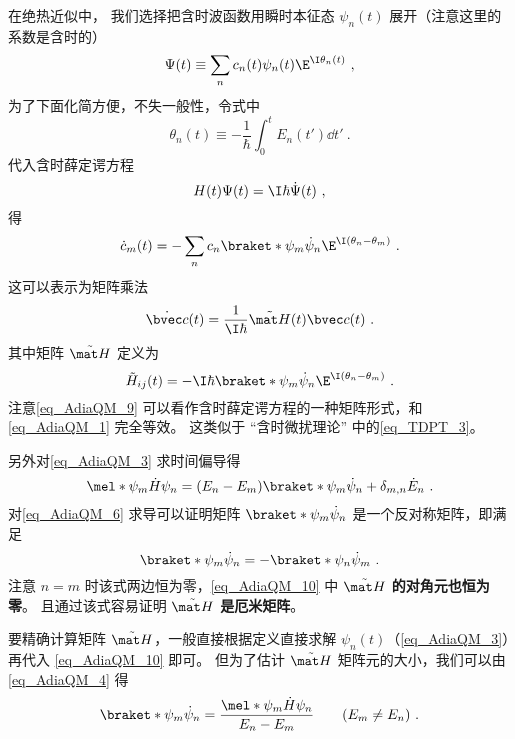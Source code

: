 在绝热近似中， 我们选择把含时波函数用瞬时本征态 $\psi_n(t)$ 展开（注意这里的系数是含时的）
\begin{equation}
\Psi(t) \equiv \sum_n c_n(t) \psi_n(t) \E^{\I \theta_n(t)}~,
\end{equation}
为了下面化简方便，不失一般性，令式中
\begin{equation}
\theta_n(t) \equiv -\frac{1}{\hbar} \int_0^t E_n(t')\dd{t'}~.
\end{equation}
代入含时薛定谔方程
\begin{equation}\label{eq_AdiaQM_1}
H(t)\Psi(t) = \I\hbar \dot \Psi(t)~,
\end{equation}
得
\begin{equation}\label{eq_AdiaQM_5}
\dot c_m(t) = -\sum_n c_n \braket*{\psi_m}{\dot\psi_n}\E^{\I(\theta_n-\theta_m)}~.
\end{equation}
这可以表示为矩阵乘法
\begin{equation}\label{eq_AdiaQM_9}
\dot{\bvec c}(t) = \frac{1}{\I\hbar}\tilde{\mat H}(t) \bvec c(t)~.
\end{equation}
其中矩阵 $\tilde{\mat H}$ 定义为
\begin{equation}\label{eq_AdiaQM_10}
\tilde H_{ij}(t) = -\I\hbar \braket*{\psi_m}{\dot\psi_n}\E^{\I(\theta_n-\theta_m)}~.
\end{equation}
注意\autoref{eq_AdiaQM_9} 可以看作含时薛定谔方程的一种矩阵形式，和\autoref{eq_AdiaQM_1} 完全等效。 这类似于 “含时微扰理论” 中的\autoref{eq_TDPT_3}。

另外对\autoref{eq_AdiaQM_3} 求时间偏导得
\begin{equation}\label{eq_AdiaQM_4}
\mel*{\psi_m}{\dot H}{\psi_n} = (E_n-E_m)\braket*{\psi_m}{\dot\psi_n} + \delta_{m,n}\dot E_n~.
\end{equation}
对\autoref{eq_AdiaQM_6} 求导可以证明矩阵 $\braket*{\psi_m}{\dot\psi_n}$ 是一个反对称矩阵，即满足
\begin{equation}\label{eq_AdiaQM_7}
\braket*{\psi_m}{\dot\psi_n} = -\braket*{\psi_n}{\dot\psi_m}~.
\end{equation}
注意 $n=m$ 时该式两边恒为零，\autoref{eq_AdiaQM_10} 中 \textbf{$\tilde{\mat H}$ 的对角元也恒为零}。 且通过该式容易证明 \textbf{$\tilde{\mat H}$ 是厄米矩阵}。

要精确计算矩阵 $\tilde{\mat H}$，一般直接根据定义直接求解 $\psi_n(t)$（\autoref{eq_AdiaQM_3}）再代入 \autoref{eq_AdiaQM_10} 即可。 但为了估计 $\tilde{\mat H}$ 矩阵元的大小，我们可以由\autoref{eq_AdiaQM_4} 得
\begin{equation}\label{eq_AdiaQM_11}
\braket*{\psi_m}{\dot\psi_n} = \frac{\mel*{\psi_m}{\dot H}{\psi_n}}{E_n-E_m} \qquad (E_m\ne E_n)~.
\end{equation}

